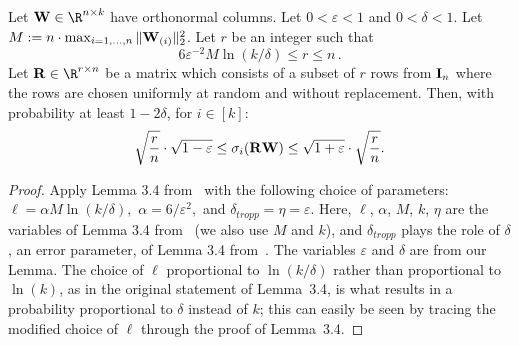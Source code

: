 \begin{lemma}
\label{lemma:sampling-ortho}
Let $\matW \in \R^{n \times k}$ have orthonormal columns.
Let $0 < \varepsilon < 1$ and $0 < \delta < 1$. Let $ M:= n \cdot  \max\nolimits_{i=1,...,n} \mbox{}\|{\bm{\mathrm{W}}}_{(i)}\|_2^2$.
Let $r$ be an integer such that
\begin{equation}\label{eqn:r3}
6 \varepsilon^{-2} M \ln (k/\delta) \leq r \leq n \,.
\end{equation}
Let $\matR \in \R^{r \times n}$ be a matrix which consists of a subset of $r$ rows from ${\bm{\mathrm{I}}}_n$
where the rows are  chosen uniformly at random and without replacement.
Then, with probability at least $1-2\delta$, for $i\in[k]$:
$$ \sqrt{{r\over n}} \cdot \sqrt{1-\varepsilon} \le \sigma_i( {\bm{\mathrm{R}}} {\bm{\mathrm{W}}}) \le  \sqrt{1+\varepsilon} \cdot \sqrt{{r\over n}} .$$
\end{lemma}
\begin{proof}
Apply Lemma 3.4 from~\cite{Tro11} with the following choice of parameters:
$\ell = \alpha M \ln(k/\delta),$
$\alpha = 6/\varepsilon^2,$ and
$\delta_{tropp} = \eta = \varepsilon$.
Here, $\ell$, $\alpha$, $M$, $k$, $\eta$ are the variables of  Lemma 3.4 from~\cite{Tro11} (we also use $M$ and $k$), and
$\delta_{tropp}$ plays the role of $\delta$, an error parameter, of  Lemma 3.4 from~\cite{Tro11}.
The variables $\varepsilon$ and $\delta$ are from our Lemma.
The choice of $\ell$ proportional to $\ln(k/\delta)$ rather than proportional to $\ln(k)$, as in the original statement of Lemma~3.4, is what results in a probability proportional to $\delta$ instead of $k$; this can easily be seen by tracing the modified choice of $\ell$ through the proof of Lemma~3.4.
\end{proof}

